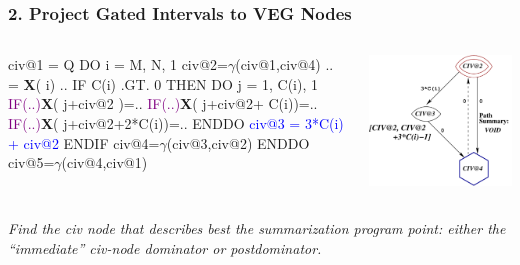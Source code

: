 \documentclass{beamer}
\newcommand{\blue}[1]{\textcolor{Blue}{{#1}}}
\newcommand{\purple}[1]{\textcolor{Purple}{{#1}}}
\newcommand{\emp}[1]{\textcolor{DikuRed}{ #1}}
\newcommand{\emphh}[1]{\textcolor{CosGreen}{ #1}}
\newcommand{\mymath}[1]{$ #1 $}
\begin{document}
\begin{frame}[fragile,t]
\frametitle{2. Project Gated Intervals to VEG Nodes}

\begin{columns}
\begin{colorcode}[fontsize=\small]
civ@1 = Q
DO i = M, N, 1
 civ@2=\mymath{\gamma}(civ@1,civ@4)
 .. = {\bf X}(\emp{i}) ..
 IF C(i) .GT. 0 THEN
  DO j = 1, C(i), 1
   \purple{IF(..)}{\bf{}X}(\emp{j+civ@2       })=..
   \purple{IF(..)}{\bf{}X}(\emp{j+civ@2+  C(i)})=..
   \purple{IF(..)}{\bf{}X}(\emp{j+civ@2+2*C(i)})=..
  ENDDO
  \blue{civ@3 = 3*C(i) + civ@2}
 ENDIF
 civ@4=\mymath{\gamma}(civ@3,civ@2)
ENDDO
civ@5=\mymath{\gamma}(civ@4,civ@1)
\end{colorcode}
\includegraphics[height=35ex]{Figures/VEG_CORREC1.pdf}
\end{columns}
\medskip

\emphh{\em Find the {\sc civ} node that describes best the 
summarization program point: either the ``immediate'' {\sc civ}-node 
dominator or postdominator.}


\end{frame}
\end{document}
